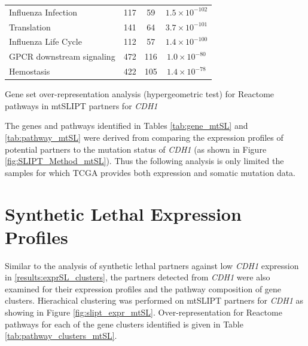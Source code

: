 \begin{table}[!ht]
{\begin{threeparttable}
\begin{tabular}{lccc}
  \rowcolor{black!5}
  Influenza Infection & 117 &  59 & $1.5 \times 10^{-102}$ \\ 
  \rowcolor{black!10}
  Translation & 141 &  64 & $3.7 \times 10^{-101}$ \\ 
  \rowcolor{black!5}
  Influenza Life Cycle & 112 &  57 & $1.4 \times 10^{-100}$ \\ 
  \rowcolor{black!10}
  GPCR downstream signaling & 472 & 116 & $1.0 \times 10^{-80}$ \\ 
  \rowcolor{black!5}
  Hemostasis & 422 & 105 & $1.4 \times 10^{-78}$ \\ 
  \hline
\end{tabular}
\begin{tablenotes}
\raggedright \small
Gene set over-representation analysis (hypergeometric test) for Reactome pathways in mtSLIPT partners for \textit{CDH1}
\end{tablenotes}
\end{threeparttable}
}
\end{table}

\FloatBarrier

The genes and pathways identified in Tables \ref{tab:gene_mtSL} and \ref{tab:pathway_mtSL} were derived from comparing the expression profiles of potential partners to the mutation status of \textit{CDH1} (as shown in Figure \ref{fig:SLIPT_Method_mtSL}). Thus the following analysis is only limited the samples for which TCGA provides both expression and somatic mutation data.

\FloatBarrier

\section{Synthetic Lethal Expression Profiles} \label{results:mtSL_clusters}

Similar to the analysis of synthetic lethal partners against low \textit{CDH1} expression in \ref{results:exprSL_clusters}, the partners detected from \textit{CDH1} were also examined for their expression profiles and the pathway composition of gene clusters. Hierachical clustering was performed on mtSLIPT partners for \textit{CDH1} as showing in Figure \ref{fig:slipt_expr_mtSL}. Over-representation for Reactome pathways for each of the gene clusters identified is given in Table \ref{tab:pathway_clusters_mtSL}.

